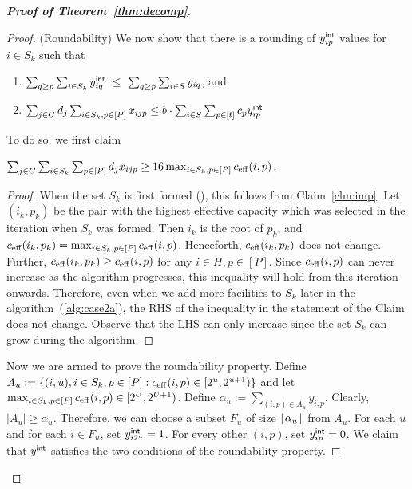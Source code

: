 \begin{proof}[{\bf Proof of Theorem~\ref{thm:decomp}}]
\begin{proof}
\noindent
(Roundability)
We now show that there is a rounding of $y^{{\mathsf{int}}}_{ip}$ values for $i\in S_k$ such that
		\begin{enumerate}
			\item $\sum_{q \geq p} \sum_{i\in S_k} y^{{\mathsf{int}}}_{iq} ~\leq~ \sum_{q \geq p}\sum_{i\in S} y_{iq}$, and
			\item $\sum_{j\in C} d_j \sum_{i\in S_k,p\in [P]} x_{ijp} \leq b\cdot \sum_{i\in S} \sum_{p\in [t]} c_py^{{\mathsf{int}}}_{ip}$
		\end{enumerate}
To do so, we first claim
\begin{claim}\label{clm:imp2}
	 $\sum_{j\in C}\sum_{i\in S_k}\sum_{p\in [P]} d_jx_{ijp} \geq 16\max_{i\in S_k,p\in [P]} c_{\mathrm{eff}}(i,p)$.
\end{claim}
\begin{proof}
	When the set $S_k$ is first formed (), this follows from Claim~\ref{clm:imp}. Let $(i_k, p_k)$ be the pair
	with the highest effective capacity which was selected in the iteration when $S_k$ was formed. Then $i_k$ is the
	root of $p_k$, and $c_{\mathrm{eff}}(i_k, p_k) = \max_{i\in S_k,p\in [P]} c_{\mathrm{eff}}(i,p)$. Henceforth, $c_{\mathrm{eff}}(i_k, p_k)$ does not
	change. Further, $c_{\mathrm{eff}}(i_k, p_k) \geq c_{\mathrm{eff}}(i,p)$ for any $i \in H, p \in [P]$. Since $c_{\mathrm{eff}}(i,p)$ can never increase as the
	algorithm progresses, this inequality will hold from this iteration onwards. Therefore, even when we add more facilities
	to $S_k$ later in the algorithm~(\cref{alg:case2a}), the RHS of the inequality in the statement of the Claim does not change.
	Observe that the LHS can only increase since the set $S_k$ can grow during the algorithm.
\end{proof}

\noindent
Now we are armed to prove the roundability property. Define $A_u := \{(i,u), i\in S_k,p\in [P]: c_{\mathrm{eff}}(i,p) \in [2^u,2^{u+1})\}$ and let $\max_{i\in S_k,p\in [P]} c_{\mathrm{eff}}(i,p) \in [2^U,2^{U+1})$.
Define $\alpha_u := \sum_{(i,p) \in A_u} y_{i,p}$. Clearly, $|A_u| \geq \alpha_u$. Therefore, we can choose a subset $F_u$ of size $\lfloor\alpha_u\rfloor$
from $A_u$.
For each $u$ and for each $i\in F_u$, set $y^{{\mathsf{int}}}_{i2^u} = 1$. For every other $(i,p)$, set $y^{{\mathsf{int}}}_{ip} = 0$. We claim that $y^{{\mathsf{int}}}$
satisfies the two conditions of the roundability property.


\end{proof}
\end{proof}
